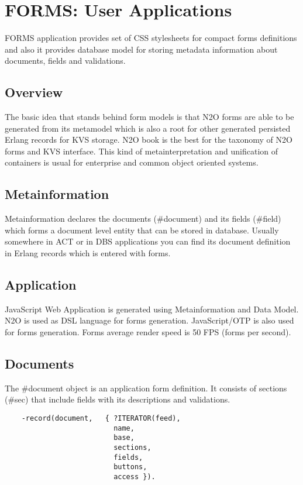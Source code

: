 \section{FORMS: User Applications}
FORMS application provides set of CSS stylesheets for compact forms definitions
and also it provides database model for storing metadata information about
documents, fields and validations.

\subsection{Overview}
The basic idea that stands behind form models is that N2O forms are able to be
generated from its metamodel which is also a root for other generated
persisted Erlang records for KVS storage. N2O book is the best for the taxonomy
of N2O forms and KVS interface. This kind of metainterpretation and unification of
containers is usual for enterprise and common object oriented systems.

\subsection{Metainformation}
Metainformation declares the documents (\#document) and its
fields (\#field) which forms a document level entity that can
be stored in database. Usually somewhere in ACT or in DBS
applications you can find its document definition in Erlang
records which is entered with forms.

\subsection{Application}
JavaScript Web Application is generated using Metainformation and Data Model.
N2O is used as DSL language for forms generation.
JavaScript/OTP is also used for forms generation.
Forms average render speed is 50 FPS (forms per second).

\newpage
\subsection{Documents}
The \#document object is an application form definition.
It consists of sections (\#sec) that include fields with
its descriptions and validations.

\vspace{1\baselineskip}
\begin{lstlisting}
    -record(document,   { ?ITERATOR(feed),
                          name,
                          base,
                          sections,
                          fields,
                          buttons,
                          access }).
\end{lstlisting}

